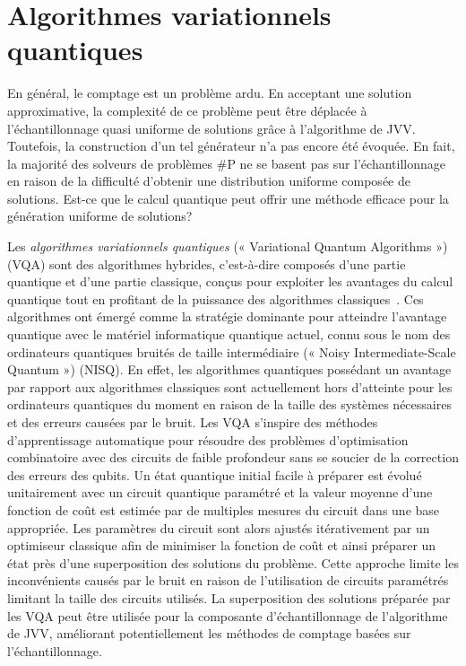 \chapter{Algorithmes variationnels quantiques}
\label{cha:algorithmes-variationnels-quantiques}

En général, le comptage est un problème ardu. En acceptant une solution approximative, la complexité de ce problème peut être déplacée à l'échantillonnage quasi uniforme de solutions grâce à l'algorithme de JVV. Toutefois, la construction d'un tel générateur n'a pas encore été évoquée. En fait, la majorité des solveurs de problèmes \textsf{\#P} ne se basent pas sur l'échantillonnage en raison de la difficulté d'obtenir une distribution uniforme composée de solutions. Est-ce que le calcul quantique peut offrir une méthode efficace pour la génération uniforme de solutions?

Les \textit{algorithmes variationnels quantiques} (« Variational Quantum Algorithms ») (VQA) sont des algorithmes hybrides, c'est-à-dire composés d'une partie quantique et d'une partie classique, conçus pour exploiter les avantages du calcul quantique tout en profitant de la puissance des algorithmes classiques~\cite{cerezoVariationalQuantumAlgorithms2021}. Ces algorithmes ont émergé comme la stratégie dominante pour atteindre l'avantage quantique avec le matériel informatique quantique actuel, connu sous le nom des ordinateurs quantiques bruités de taille intermédiaire (« Noisy Intermediate-Scale Quantum ») (NISQ). En effet, les algorithmes quantiques possédant un avantage par rapport aux algorithmes classiques sont actuellement hors d'atteinte pour les ordinateurs quantiques du moment en raison de la taille des systèmes nécessaires et des erreurs causées par le bruit. Les VQA s'inspire des méthodes d'apprentissage automatique pour résoudre des problèmes d'optimisation combinatoire avec des circuits de faible profondeur sans se soucier de la correction des erreurs des qubits. Un état quantique initial facile à préparer est évolué unitairement avec un circuit quantique paramétré et la valeur moyenne d'une fonction de coût est estimée par de multiples mesures du circuit dans une base appropriée. Les paramètres du circuit sont alors ajustés itérativement par un optimiseur classique afin de minimiser la fonction de coût et ainsi préparer un état près d'une superposition des solutions du problème. Cette approche limite les inconvénients causés par le bruit en raison de l'utilisation de circuits paramétrés limitant la taille des circuits utilisés. La superposition des solutions préparée par les VQA peut être utilisée pour la composante d'échantillonnage de l'algorithme de JVV, améliorant potentiellement les méthodes de comptage basées sur l'échantillonnage.

